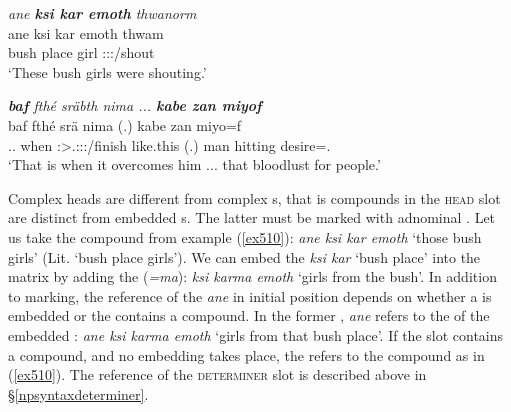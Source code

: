 \begin{exe}
 	\ex \emph{ane \textbf{ksi kar emoth} thwanorm}\\
 	\gll ane ksi kar emoth thwam\\
 	\Dem{} bush place girl \Stpl:\Sbj:\Pst:\Dur/shout\\
 	\trans `These bush girls were shouting.'
 	\label{ex510}
\end{exe}
\begin{exe}
 	\ex \emph{\textbf{baf} fthé sräbth nima ... \textbf{kabe zan miyof}}\\
 	\gll baf fthé srä nima (.) kabe zan miyo=f\\
 	\Recog.\Erg.\Sg{} when \Stsg:\Sbj>\Tsg.\Masc:\Obj:\Irr:\Pfv/finish like.this (.) man hitting desire=\Erg.\Sg\\
 	\trans `That is when it overcomes him ... that bloodlust for people.'\\
 	\label{ex511}
\end{exe}

Complex heads are different from complex s, that is compounds in the \textsc{head} slot are distinct from embedded s. The latter must be marked with adnominal . Let us take the compound from example (\ref{ex510}): \emph{ane ksi kar emoth} `those bush girls' (Lit. `bush place girls'). We can embed the  \emph{ksi kar} `bush place' into the matrix  by adding the   (\emph{=ma}): \emph{ksi karma emoth} `girls from the bush'. In addition to  marking, the reference of the  \emph{ane} in initial position depends on whether a  is embedded or the  contains a compound. In the former , \emph{ane} refers to the  of the embedded : \emph{ane ksi karma emoth} `girls from that bush place'. If the  slot contains a compound, and no embedding takes place, the  refers to the compound as in (\ref{ex510}). The reference of the \textsc{determiner} slot is described above in \S{}\ref{npsyntaxdeterminer}.%


